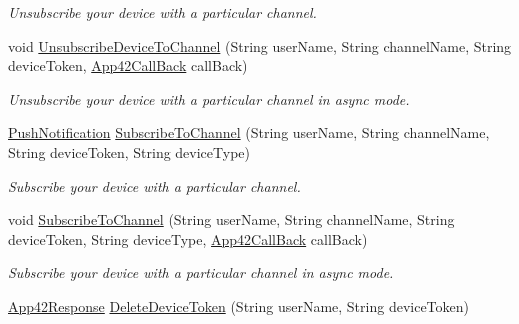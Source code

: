 \begin{DoxyCompactItemize}
\begin{DoxyCompactList}\small\item\em Unsubscribe your device with a particular channel. \end{DoxyCompactList}\item 
void \hyperlink{classcom_1_1shephertz_1_1app42_1_1paas_1_1sdk_1_1csharp_1_1push_notification_1_1_push_notification_service_a5c171adf825185879e1d7ddef7867fe8}{Unsubscribe\+Device\+To\+Channel} (String user\+Name, String channel\+Name, String device\+Token, \hyperlink{interfacecom_1_1shephertz_1_1app42_1_1paas_1_1sdk_1_1csharp_1_1_app42_call_back}{App42\+Call\+Back} call\+Back)
\begin{DoxyCompactList}\small\item\em Unsubscribe your device with a particular channel in async mode. \end{DoxyCompactList}\item 
\hyperlink{classcom_1_1shephertz_1_1app42_1_1paas_1_1sdk_1_1csharp_1_1push_notification_1_1_push_notification}{Push\+Notification} \hyperlink{classcom_1_1shephertz_1_1app42_1_1paas_1_1sdk_1_1csharp_1_1push_notification_1_1_push_notification_service_a94a2f09f7e043b80401f41fc564cb097}{Subscribe\+To\+Channel} (String user\+Name, String channel\+Name, String device\+Token, String device\+Type)
\begin{DoxyCompactList}\small\item\em Subscribe your device with a particular channel. \end{DoxyCompactList}\item 
void \hyperlink{classcom_1_1shephertz_1_1app42_1_1paas_1_1sdk_1_1csharp_1_1push_notification_1_1_push_notification_service_a4f6c02bbb620177b7418571ce2f5305f}{Subscribe\+To\+Channel} (String user\+Name, String channel\+Name, String device\+Token, String device\+Type, \hyperlink{interfacecom_1_1shephertz_1_1app42_1_1paas_1_1sdk_1_1csharp_1_1_app42_call_back}{App42\+Call\+Back} call\+Back)
\begin{DoxyCompactList}\small\item\em Subscribe your device with a particular channel in async mode. \end{DoxyCompactList}\item 
\hyperlink{classcom_1_1shephertz_1_1app42_1_1paas_1_1sdk_1_1csharp_1_1_app42_response}{App42\+Response} \hyperlink{classcom_1_1shephertz_1_1app42_1_1paas_1_1sdk_1_1csharp_1_1push_notification_1_1_push_notification_service_ad471149d818d99bb0eca9b550edfbcec}{Delete\+Device\+Token} (String user\+Name, String device\+Token)

\end{DoxyCompactItemize}
